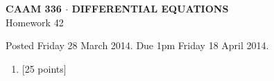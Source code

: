 \documentclass[10pt]{article}
\begin{document}
\vspace*{-5em}
\begin{center}
\large \textsf{\textbf{CAAM 336 $\cdot$ DIFFERENTIAL EQUATIONS}\\[0.5em]
Homework 42 }
\end{center}

Posted Friday 28 March 2014.  Due 1pm Friday 18 April 2014.

\begin{enumerate}\addtocounter{enumi}{41}
\item {[25 points]}  
\end{enumerate}
\end{document}
